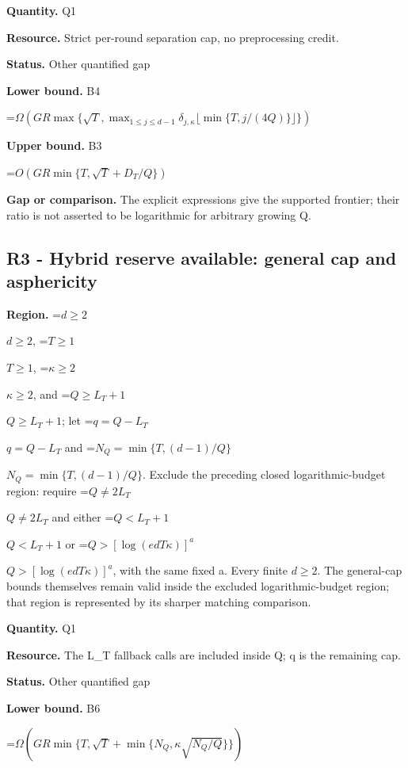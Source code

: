 \documentclass[10pt,a4paper]{article}
\newcommand{\AtlasMath}[1]{\par\begingroup\centering\setbox0=\hbox{$\displaystyle #1$}\ifdim\wd0>1.4\linewidth\typeout{ATLAS WIDE FORMULA: \the\wd0}\fi\ifdim\wd0>\linewidth\resizebox{\linewidth}{!}{\box0}\else\box0\fi\par\endgroup}
\newcommand{\AtlasInlineMath}[1]{\begingroup\setbox0=\hbox{$#1$}\ifdim\wd0>.4\linewidth\endgroup\AtlasMath{#1}\else\endgroup$#1$\fi}
\begin{document}
\textbf{Quantity.} Q1



\textbf{Resource.} Strict per-round separation cap, no preprocessing credit.



\textbf{Status.} Other quantified gap



\textbf{Lower bound.} B4



\AtlasMath{\Omega\!\left(GR\max\{\sqrt T,\max_{1\le j\le d-1}\delta_{j,\kappa}\lfloor\min\{T,j/(4Q)\}\rfloor\}\right)}


\textbf{Upper bound.} B3



\AtlasMath{O(GR\min\{T,\sqrt T+D_T/Q\})}


\textbf{Gap or comparison.} The explicit expressions give the supported frontier; their ratio is not asserted to be logarithmic for arbitrary growing Q.



\subsection{R3 - Hybrid reserve available: general cap and asphericity}


\textbf{Region.} \AtlasInlineMath{d\ge2}, \AtlasInlineMath{T\ge1}, \AtlasInlineMath{\kappa\ge2}, and \AtlasInlineMath{Q\ge L_T+1}; let \AtlasInlineMath{q=Q-L_T} and \AtlasInlineMath{N_Q=\min\{T,(d-1)/Q\}}. Exclude the preceding closed logarithmic-budget region: require \AtlasInlineMath{Q\ne2L_T} and either \AtlasInlineMath{Q<L_T+1} or \AtlasInlineMath{Q>[\log(edT\kappa)]^a}, with the same fixed a. Every finite $d\ge 2$. The general-cap bounds themselves remain valid inside the excluded logarithmic-budget region; that region is represented by its sharper matching comparison.



\textbf{Quantity.} Q1



\textbf{Resource.} The L\_T fallback calls are included inside Q; q is the remaining cap.



\textbf{Status.} Other quantified gap



\textbf{Lower bound.} B6



\AtlasMath{\Omega\!\left(GR\min\{T,\sqrt T+\min\{N_Q,\kappa\sqrt{N_Q/Q}\}\}\right)}
\end{document}
